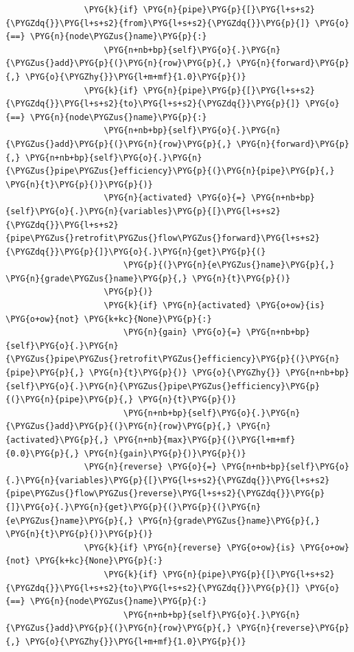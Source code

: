 \begin{Verbatim}
                \PYG{k}{if} \PYG{n}{pipe}\PYG{p}{[}\PYG{l+s+s2}{\PYGZdq{}}\PYG{l+s+s2}{from}\PYG{l+s+s2}{\PYGZdq{}}\PYG{p}{]} \PYG{o}{==} \PYG{n}{node\PYGZus{}name}\PYG{p}{:}
                    \PYG{n+nb+bp}{self}\PYG{o}{.}\PYG{n}{\PYGZus{}add}\PYG{p}{(}\PYG{n}{row}\PYG{p}{,} \PYG{n}{forward}\PYG{p}{,} \PYG{o}{\PYGZhy{}}\PYG{l+m+mf}{1.0}\PYG{p}{)}
                \PYG{k}{if} \PYG{n}{pipe}\PYG{p}{[}\PYG{l+s+s2}{\PYGZdq{}}\PYG{l+s+s2}{to}\PYG{l+s+s2}{\PYGZdq{}}\PYG{p}{]} \PYG{o}{==} \PYG{n}{node\PYGZus{}name}\PYG{p}{:}
                    \PYG{n+nb+bp}{self}\PYG{o}{.}\PYG{n}{\PYGZus{}add}\PYG{p}{(}\PYG{n}{row}\PYG{p}{,} \PYG{n}{forward}\PYG{p}{,} \PYG{n+nb+bp}{self}\PYG{o}{.}\PYG{n}{\PYGZus{}pipe\PYGZus{}efficiency}\PYG{p}{(}\PYG{n}{pipe}\PYG{p}{,} \PYG{n}{t}\PYG{p}{)}\PYG{p}{)}
                    \PYG{n}{activated} \PYG{o}{=} \PYG{n+nb+bp}{self}\PYG{o}{.}\PYG{n}{variables}\PYG{p}{[}\PYG{l+s+s2}{\PYGZdq{}}\PYG{l+s+s2}{pipe\PYGZus{}retrofit\PYGZus{}flow\PYGZus{}forward}\PYG{l+s+s2}{\PYGZdq{}}\PYG{p}{]}\PYG{o}{.}\PYG{n}{get}\PYG{p}{(}
                        \PYG{p}{(}\PYG{n}{e\PYGZus{}name}\PYG{p}{,} \PYG{n}{grade\PYGZus{}name}\PYG{p}{,} \PYG{n}{t}\PYG{p}{)}
                    \PYG{p}{)}
                    \PYG{k}{if} \PYG{n}{activated} \PYG{o+ow}{is} \PYG{o+ow}{not} \PYG{k+kc}{None}\PYG{p}{:}
                        \PYG{n}{gain} \PYG{o}{=} \PYG{n+nb+bp}{self}\PYG{o}{.}\PYG{n}{\PYGZus{}pipe\PYGZus{}retrofit\PYGZus{}efficiency}\PYG{p}{(}\PYG{n}{pipe}\PYG{p}{,} \PYG{n}{t}\PYG{p}{)} \PYG{o}{\PYGZhy{}} \PYG{n+nb+bp}{self}\PYG{o}{.}\PYG{n}{\PYGZus{}pipe\PYGZus{}efficiency}\PYG{p}{(}\PYG{n}{pipe}\PYG{p}{,} \PYG{n}{t}\PYG{p}{)}
                        \PYG{n+nb+bp}{self}\PYG{o}{.}\PYG{n}{\PYGZus{}add}\PYG{p}{(}\PYG{n}{row}\PYG{p}{,} \PYG{n}{activated}\PYG{p}{,} \PYG{n+nb}{max}\PYG{p}{(}\PYG{l+m+mf}{0.0}\PYG{p}{,} \PYG{n}{gain}\PYG{p}{)}\PYG{p}{)}
                \PYG{n}{reverse} \PYG{o}{=} \PYG{n+nb+bp}{self}\PYG{o}{.}\PYG{n}{variables}\PYG{p}{[}\PYG{l+s+s2}{\PYGZdq{}}\PYG{l+s+s2}{pipe\PYGZus{}flow\PYGZus{}reverse}\PYG{l+s+s2}{\PYGZdq{}}\PYG{p}{]}\PYG{o}{.}\PYG{n}{get}\PYG{p}{(}\PYG{p}{(}\PYG{n}{e\PYGZus{}name}\PYG{p}{,} \PYG{n}{grade\PYGZus{}name}\PYG{p}{,} \PYG{n}{t}\PYG{p}{)}\PYG{p}{)}
                \PYG{k}{if} \PYG{n}{reverse} \PYG{o+ow}{is} \PYG{o+ow}{not} \PYG{k+kc}{None}\PYG{p}{:}
                    \PYG{k}{if} \PYG{n}{pipe}\PYG{p}{[}\PYG{l+s+s2}{\PYGZdq{}}\PYG{l+s+s2}{to}\PYG{l+s+s2}{\PYGZdq{}}\PYG{p}{]} \PYG{o}{==} \PYG{n}{node\PYGZus{}name}\PYG{p}{:}
                        \PYG{n+nb+bp}{self}\PYG{o}{.}\PYG{n}{\PYGZus{}add}\PYG{p}{(}\PYG{n}{row}\PYG{p}{,} \PYG{n}{reverse}\PYG{p}{,} \PYG{o}{\PYGZhy{}}\PYG{l+m+mf}{1.0}\PYG{p}{)}

\end{Verbatim}
